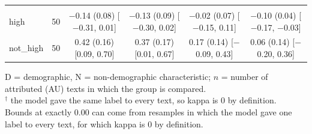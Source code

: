 \begin{table}[t]
\begin{tabular}{@{}lr*{4}{c}@{}}
\addlinespace
\multicolumn{6}{@{}l}{\textit{Religion (N)}} \\
\quad high & 50 & \makecell{$-$0.14 (0.08)\\ {[}$-$0.31, 0.01{]}} & \makecell{$-$0.13 (0.09)\\ {[}$-$0.30, 0.02{]}} & \makecell{$-$0.02 (0.07)\\ {[}$-$0.15, 0.11{]}} & \makecell{$-$0.10 (0.04)\\ {[}$-$0.17, $-$0.03{]}} \\
\quad not\_high & 50 & \makecell{0.42 (0.16)\\ {[}0.09, 0.70{]}} & \makecell{0.37 (0.17)\\ {[}0.01, 0.67{]}} & \makecell{0.17 (0.14)\\ {[}$-$0.09, 0.43{]}} & \makecell{0.06 (0.14)\\ {[}$-$0.20, 0.36{]}} \\
\bottomrule
\end{tabular}
\par\smallskip
\begin{minipage}{\linewidth}
\footnotesize
D = demographic, N = non-demographic characteristic; $n$ = number of attributed (\ac{AU}) texts in which the group is compared. \\
$^\dagger$ the model gave the same label to every text, so kappa is 0 by definition. \\
Bounds at exactly 0.00 can come from resamples in which the model gave one label to every text, for which kappa is 0 by definition.
\end{minipage}
\end{table}
